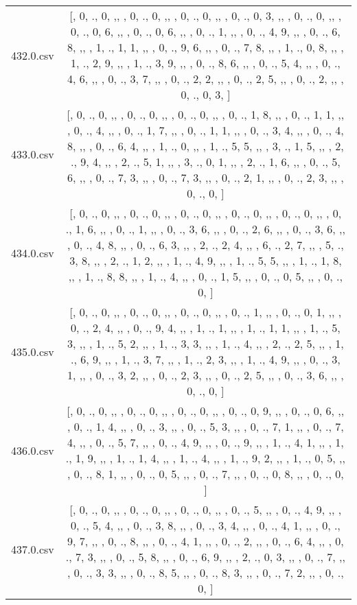 \begin{table}[ht]
\begin{tabular}{@{}c c@{}}
	432.0.csv & [, 0, ., 0, ,,  , 0, ., 0, ,,  , 0, ., 0, ,,  , 0, ., 0, 3, ,,  , 0, ., 0, ,,  , 0, ., 0, 6, ,,  , 0, ., 0, 6, ,,  , 0, ., 1, ,,  , 0, ., 4, 9, ,,  , 0, ., 6, 8, ,,  , 1, ., 1, 1, ,,  , 0, ., 9, 6, ,,  , 0, ., 7, 8, ,,  , 1, ., 0, 8, ,,  , 1, ., 2, 9, ,,  , 1, ., 3, 9, ,,  , 0, ., 8, 6, ,,  , 0, ., 5, 4, ,,  , 0, ., 4, 6, ,,  , 0, ., 3, 7, ,,  , 0, ., 2, 2, ,,  , 0, ., 2, 5, ,,  , 0, ., 2, ,,  , 0, ., 0, 3, ]\\ 
	433.0.csv & [, 0, ., 0, ,,  , 0, ., 0, ,,  , 0, ., 0, ,,  , 0, ., 1, 8, ,,  , 0, ., 1, 1, ,,  , 0, ., 4, ,,  , 0, ., 1, 7, ,,  , 0, ., 1, 1, ,,  , 0, ., 3, 4, ,,  , 0, ., 4, 8, ,,  , 0, ., 6, 4, ,,  , 1, ., 0, ,,  , 1, ., 5, 5, ,,  , 3, ., 1, 5, ,,  , 2, ., 9, 4, ,,  , 2, ., 5, 1, ,,  , 3, ., 0, 1, ,,  , 2, ., 1, 6, ,,  , 0, ., 5, 6, ,,  , 0, ., 7, 3, ,,  , 0, ., 7, 3, ,,  , 0, ., 2, 1, ,,  , 0, ., 2, 3, ,,  , 0, ., 0, ]\\ 
	434.0.csv & [, 0, ., 0, ,,  , 0, ., 0, ,,  , 0, ., 0, ,,  , 0, ., 0, ,,  , 0, ., 0, ,,  , 0, ., 1, 6, ,,  , 0, ., 1, ,,  , 0, ., 3, 6, ,,  , 0, ., 2, 6, ,,  , 0, ., 3, 6, ,,  , 0, ., 4, 8, ,,  , 0, ., 6, 3, ,,  , 2, ., 2, 4, ,,  , 6, ., 2, 7, ,,  , 5, ., 3, 8, ,,  , 2, ., 1, 2, ,,  , 1, ., 4, 9, ,,  , 1, ., 5, 5, ,,  , 1, ., 1, 8, ,,  , 1, ., 8, 8, ,,  , 1, ., 4, ,,  , 0, ., 1, 5, ,,  , 0, ., 0, 5, ,,  , 0, ., 0, ]\\ 
	435.0.csv & [, 0, ., 0, ,,  , 0, ., 0, ,,  , 0, ., 0, ,,  , 0, ., 1, ,,  , 0, ., 0, 1, ,,  , 0, ., 2, 4, ,,  , 0, ., 9, 4, ,,  , 1, ., 1, ,,  , 1, ., 1, 1, ,,  , 1, ., 5, 3, ,,  , 1, ., 5, 2, ,,  , 1, ., 3, 3, ,,  , 1, ., 4, ,,  , 2, ., 2, 5, ,,  , 1, ., 6, 9, ,,  , 1, ., 3, 7, ,,  , 1, ., 2, 3, ,,  , 1, ., 4, 9, ,,  , 0, ., 3, 1, ,,  , 0, ., 3, 2, ,,  , 0, ., 2, 3, ,,  , 0, ., 2, 5, ,,  , 0, ., 3, 6, ,,  , 0, ., 0, ]\\ 
	436.0.csv & [, 0, ., 0, ,,  , 0, ., 0, ,,  , 0, ., 0, ,,  , 0, ., 0, 9, ,,  , 0, ., 0, 6, ,,  , 0, ., 1, 4, ,,  , 0, ., 3, ,,  , 0, ., 5, 3, ,,  , 0, ., 7, 1, ,,  , 0, ., 7, 4, ,,  , 0, ., 5, 7, ,,  , 0, ., 4, 9, ,,  , 0, ., 9, ,,  , 1, ., 4, 1, ,,  , 1, ., 1, 9, ,,  , 1, ., 1, 4, ,,  , 1, ., 4, ,,  , 1, ., 9, 2, ,,  , 1, ., 0, 5, ,,  , 0, ., 8, 1, ,,  , 0, ., 0, 5, ,,  , 0, ., 7, ,,  , 0, ., 0, 8, ,,  , 0, ., 0, ]\\ 
	437.0.csv & [, 0, ., 0, ,,  , 0, ., 0, ,,  , 0, ., 0, ,,  , 0, ., 5, ,,  , 0, ., 4, 9, ,,  , 0, ., 5, 4, ,,  , 0, ., 3, 8, ,,  , 0, ., 3, 4, ,,  , 0, ., 4, 1, ,,  , 0, ., 9, 7, ,,  , 0, ., 8, ,,  , 0, ., 4, 1, ,,  , 0, ., 2, ,,  , 0, ., 6, 4, ,,  , 0, ., 7, 3, ,,  , 0, ., 5, 8, ,,  , 0, ., 6, 9, ,,  , 2, ., 0, 3, ,,  , 0, ., 7, ,,  , 0, ., 3, 3, ,,  , 0, ., 8, 5, ,,  , 0, ., 8, 3, ,,  , 0, ., 7, 2, ,,  , 0, ., 0, ]\\ 

\end{tabular}
\end{table}
